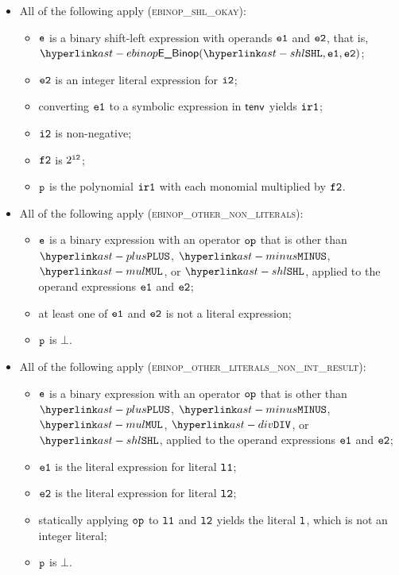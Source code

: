 \begin{itemize}
  \item All of the following apply (\textsc{ebinop\_shl\_okay}):
  \begin{itemize}
    \item $\texttt{e}$ is a binary shift-left expression with operands $\texttt{e1}$ and $\texttt{e2}$, that is, \\ $\EBinop(\SHL, \veone, \vetwo)$;
    \item $\texttt{e2}$ is an integer literal expression for $\texttt{i2}$;
    \item converting $\texttt{e1}$ to a symbolic expression in $\textsf{tenv}$ yields $\texttt{ir1}$\ProseOrTypeErrorOrBot;
    \item $\texttt{i2}$ is non-negative;
    \item $\texttt{f2}$ is $2^{\texttt{i2}}$;
    \item $\texttt{p}$ is the polynomial $\texttt{ir1}$ with each monomial multiplied by $\texttt{f2}$.
  \end{itemize}

  \item All of the following apply (\textsc{ebinop\_other\_non\_literals}):
  \begin{itemize}
    \item $\texttt{e}$ is a binary expression with an operator $\texttt{op}$ that is other than $\PLUS$, $\MINUS$, $\MUL$, or $\SHL$,
          applied to the operand expressions $\texttt{e1}$ and $\texttt{e2}$;
    \item at least one of $\texttt{e1}$ and $\texttt{e2}$ is not a literal expression;
    \item $\texttt{p}$ is $\bot$.
  \end{itemize}

  \item All of the following apply (\textsc{ebinop\_other\_literals\_non\_int\_result}):
  \begin{itemize}
    \item $\texttt{e}$ is a binary expression with an operator $\texttt{op}$ that is other than $\PLUS$, $\MINUS$, $\MUL$, $\DIV$, or $\SHL$,
          applied to the operand expressions $\texttt{e1}$ and $\texttt{e2}$;
    \item $\texttt{e1}$ is the literal expression for literal $\texttt{l1}$;
    \item $\texttt{e2}$ is the literal expression for literal $\texttt{l2}$;
    \item statically applying $\texttt{op}$ to $\texttt{l1}$ and $\texttt{l2}$ yields the literal $\texttt{l}$, which is not an integer literal;
    \item $\texttt{p}$ is $\bot$.
  \end{itemize}


\end{itemize}
